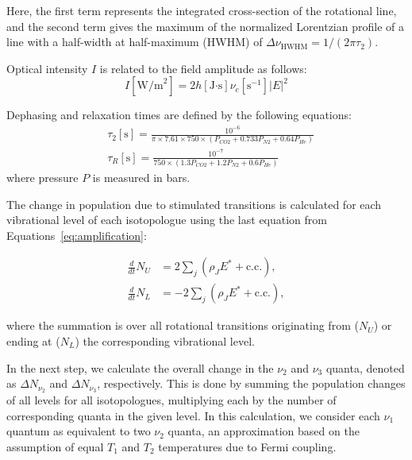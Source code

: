 \documentclass{report}
\begin{document}
Here, the first term represents the integrated cross-section of the rotational line, and the second term gives the maximum of the normalized Lorentzian profile of a line with a half-width at half-maximum (HWHM) of $\Delta \nu_{\text{HWHM}} = 1/(2\pi \tau_2)$.

Optical intensity $I$ is related to the field amplitude as follows:
\begin{equation}\label{eq:I}
I[\text{W/m}^2] = 2 h[\text{J·s}] \nu _c[\text{s}^{-1}] |E|^2
\end{equation}

Dephasing and relaxation times are defined by the following equations:
\begin{equation}\label{eq:relaxation}
\begin{aligned}
&\tau_2[\text{s}] = \frac{10^{- 6}}{\pi \times 7.61 \times 750 \times (P_{CO2}+0.733P_{N2}+0.64P_{He})}\\
&\tau _R[\text{s}] = \frac{10^{-7}}{750 \times (1.3P_{CO2}+1.2P_{N2}+0.6P_{He})}
\end{aligned}
\end{equation}
where pressure $P$ is measured in bars.


The change in population due to stimulated transitions is calculated for each vibrational level of each isotopologue using the last equation from Equations~\eqref{eq:amplification}:

\begin{equation}\label{eq:dNdt}
\begin{aligned}
\frac{d}{dt} N_U &= 2 \sum_{j} \left( \rho_J E^* + \text{c.c.} \right), \\
\frac{d}{dt} N_L &= -2 \sum_{j} \left( \rho_J E^* + \text{c.c.} \right),
\end{aligned}
\end{equation}

where the summation is over all rotational transitions originating from ($N_U$) or ending at ($N_L$) the corresponding vibrational level.

In the next step, we calculate the overall change in the $\nu_2$ and $\nu_3$ quanta, denoted as $\Delta N_{\nu_2}$ and $\Delta N_{\nu_3}$, respectively. This is done by summing the population changes of all levels for all isotopologues, multiplying each by the number of corresponding quanta in the given level. In this calculation, we consider each $\nu_1$ quantum as equivalent to two $\nu_2$ quanta, an approximation based on the assumption of equal $T_1$ and $T_2$ temperatures due to Fermi coupling.
\end{document}
